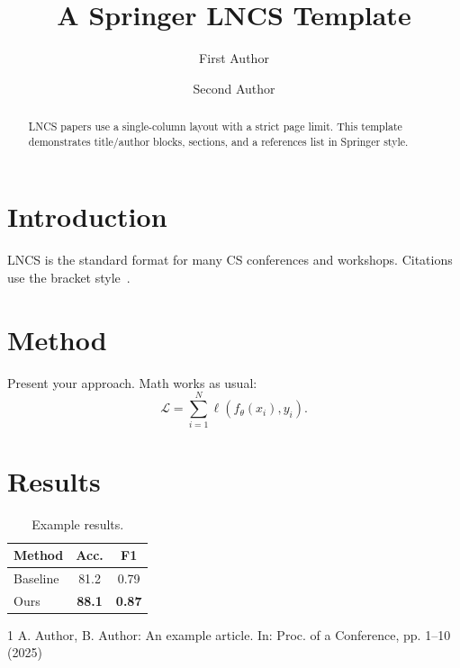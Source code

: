\documentclass{llncs}
\begin{document}
\title{A Springer LNCS Template}
\author{First Author \and Second Author}

\maketitle

\begin{abstract}
LNCS papers use a single-column layout with a strict page limit. This
template demonstrates title/author blocks, sections, and a references
list in Springer style.
\end{abstract}

\section{Introduction}
LNCS is the standard format for many CS conferences and workshops.
Citations use the bracket style~\cite{spr_demo}.

\section{Method}
Present your approach. Math works as usual:
\begin{equation}
  \mathcal{L} = \sum_{i=1}^{N} \ell(f_\theta(x_i), y_i).
\end{equation}

\section{Results}
\begin{table}[h]
  \centering
  \caption{Example results.}
  \begin{tabular}{lcc}
    \toprule
    Method & Acc. & F1 \\
    \midrule
    Baseline & 81.2 & 0.79 \\
    Ours     & \textbf{88.1} & \textbf{0.87} \\
    \bottomrule
  \end{tabular}
\end{table}

\begin{thebibliography}{1}
A. Author, B. Author: An example article. In: Proc. of a Conference, pp. 1--10 (2025)
\end{thebibliography}
\end{document}
